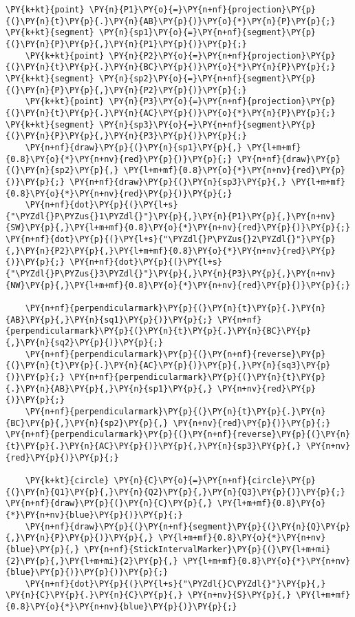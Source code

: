 \begin{Verbatim}[commandchars=\\\{\}]
    \PY{k+kt}{point} \PY{n}{P1}\PY{o}{=}\PY{n+nf}{projection}\PY{p}{(}\PY{n}{t}\PY{p}{.}\PY{n}{AB}\PY{p}{)}\PY{o}{*}\PY{n}{P}\PY{p}{;} \PY{k+kt}{segment} \PY{n}{sp1}\PY{o}{=}\PY{n+nf}{segment}\PY{p}{(}\PY{n}{P}\PY{p}{,}\PY{n}{P1}\PY{p}{)}\PY{p}{;}
    \PY{k+kt}{point} \PY{n}{P2}\PY{o}{=}\PY{n+nf}{projection}\PY{p}{(}\PY{n}{t}\PY{p}{.}\PY{n}{BC}\PY{p}{)}\PY{o}{*}\PY{n}{P}\PY{p}{;} \PY{k+kt}{segment} \PY{n}{sp2}\PY{o}{=}\PY{n+nf}{segment}\PY{p}{(}\PY{n}{P}\PY{p}{,}\PY{n}{P2}\PY{p}{)}\PY{p}{;}
    \PY{k+kt}{point} \PY{n}{P3}\PY{o}{=}\PY{n+nf}{projection}\PY{p}{(}\PY{n}{t}\PY{p}{.}\PY{n}{AC}\PY{p}{)}\PY{o}{*}\PY{n}{P}\PY{p}{;} \PY{k+kt}{segment} \PY{n}{sp3}\PY{o}{=}\PY{n+nf}{segment}\PY{p}{(}\PY{n}{P}\PY{p}{,}\PY{n}{P3}\PY{p}{)}\PY{p}{;}
    \PY{n+nf}{draw}\PY{p}{(}\PY{n}{sp1}\PY{p}{,} \PY{l+m+mf}{0.8}\PY{o}{*}\PY{n+nv}{red}\PY{p}{)}\PY{p}{;} \PY{n+nf}{draw}\PY{p}{(}\PY{n}{sp2}\PY{p}{,} \PY{l+m+mf}{0.8}\PY{o}{*}\PY{n+nv}{red}\PY{p}{)}\PY{p}{;} \PY{n+nf}{draw}\PY{p}{(}\PY{n}{sp3}\PY{p}{,} \PY{l+m+mf}{0.8}\PY{o}{*}\PY{n+nv}{red}\PY{p}{)}\PY{p}{;}
    \PY{n+nf}{dot}\PY{p}{(}\PY{l+s}{"\PYZdl{}P\PYZus{}1\PYZdl{}"}\PY{p}{,}\PY{n}{P1}\PY{p}{,}\PY{n+nv}{SW}\PY{p}{,}\PY{l+m+mf}{0.8}\PY{o}{*}\PY{n+nv}{red}\PY{p}{)}\PY{p}{;} \PY{n+nf}{dot}\PY{p}{(}\PY{l+s}{"\PYZdl{}P\PYZus{}2\PYZdl{}"}\PY{p}{,}\PY{n}{P2}\PY{p}{,}\PY{l+m+mf}{0.8}\PY{o}{*}\PY{n+nv}{red}\PY{p}{)}\PY{p}{;} \PY{n+nf}{dot}\PY{p}{(}\PY{l+s}{"\PYZdl{}P\PYZus{}3\PYZdl{}"}\PY{p}{,}\PY{n}{P3}\PY{p}{,}\PY{n+nv}{NW}\PY{p}{,}\PY{l+m+mf}{0.8}\PY{o}{*}\PY{n+nv}{red}\PY{p}{)}\PY{p}{;}

    \PY{n+nf}{perpendicularmark}\PY{p}{(}\PY{n}{t}\PY{p}{.}\PY{n}{AB}\PY{p}{,}\PY{n}{sq1}\PY{p}{)}\PY{p}{;} \PY{n+nf}{perpendicularmark}\PY{p}{(}\PY{n}{t}\PY{p}{.}\PY{n}{BC}\PY{p}{,}\PY{n}{sq2}\PY{p}{)}\PY{p}{;}
    \PY{n+nf}{perpendicularmark}\PY{p}{(}\PY{n+nf}{reverse}\PY{p}{(}\PY{n}{t}\PY{p}{.}\PY{n}{AC}\PY{p}{)}\PY{p}{,}\PY{n}{sq3}\PY{p}{)}\PY{p}{;} \PY{n+nf}{perpendicularmark}\PY{p}{(}\PY{n}{t}\PY{p}{.}\PY{n}{AB}\PY{p}{,}\PY{n}{sp1}\PY{p}{,} \PY{n+nv}{red}\PY{p}{)}\PY{p}{;}
    \PY{n+nf}{perpendicularmark}\PY{p}{(}\PY{n}{t}\PY{p}{.}\PY{n}{BC}\PY{p}{,}\PY{n}{sp2}\PY{p}{,} \PY{n+nv}{red}\PY{p}{)}\PY{p}{;} \PY{n+nf}{perpendicularmark}\PY{p}{(}\PY{n+nf}{reverse}\PY{p}{(}\PY{n}{t}\PY{p}{.}\PY{n}{AC}\PY{p}{)}\PY{p}{,}\PY{n}{sp3}\PY{p}{,} \PY{n+nv}{red}\PY{p}{)}\PY{p}{;}

    \PY{k+kt}{circle} \PY{n}{C}\PY{o}{=}\PY{n+nf}{circle}\PY{p}{(}\PY{n}{Q1}\PY{p}{,}\PY{n}{Q2}\PY{p}{,}\PY{n}{Q3}\PY{p}{)}\PY{p}{;} \PY{n+nf}{draw}\PY{p}{(}\PY{n}{C}\PY{p}{,} \PY{l+m+mf}{0.8}\PY{o}{*}\PY{n+nv}{blue}\PY{p}{)}\PY{p}{;}
    \PY{n+nf}{draw}\PY{p}{(}\PY{n+nf}{segment}\PY{p}{(}\PY{n}{Q}\PY{p}{,}\PY{n}{P}\PY{p}{)}\PY{p}{,} \PY{l+m+mf}{0.8}\PY{o}{*}\PY{n+nv}{blue}\PY{p}{,} \PY{n+nf}{StickIntervalMarker}\PY{p}{(}\PY{l+m+mi}{2}\PY{p}{,}\PY{l+m+mi}{2}\PY{p}{,} \PY{l+m+mf}{0.8}\PY{o}{*}\PY{n+nv}{blue}\PY{p}{)}\PY{p}{)}\PY{p}{;}
    \PY{n+nf}{dot}\PY{p}{(}\PY{l+s}{"\PYZdl{}C\PYZdl{}"}\PY{p}{,} \PY{n}{C}\PY{p}{.}\PY{n}{C}\PY{p}{,} \PY{n+nv}{S}\PY{p}{,} \PY{l+m+mf}{0.8}\PY{o}{*}\PY{n+nv}{blue}\PY{p}{)}\PY{p}{;}
\end{Verbatim}
